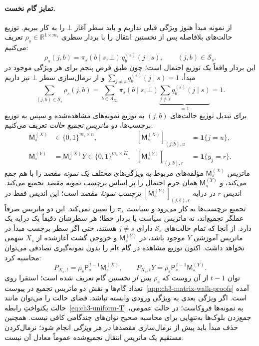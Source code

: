 \paragraph{تمایز گام نخست.}
از نمونه مبدأ هنوز ویژگی قبلی نداریم و باید سطر آغاز $\bot$ را به کار ببریم. توزیع حالت‌های بلافاصله پس از نخستین انتقال را با بردار سطری $\rho_s\in\mathbb R^{1\times m_s}$ تعریف می‌کنیم:
\begin{equation}\label{eq:ch3-block-first-step}
\rho_s(j,b)=\pi_s(b\mid s,\bot)\,q_b^{(s)}(j\mid s),
\qquad (j,b)\in\mathcal S_s.
\end{equation}
این بردار واقعاً یک توزیع احتمال است؛ چون طبق
فرض پنجم برای هر ویژگی موجود در مبدأ،
$\sum_{j\ne s}q_b^{(s)}(j\mid s)=1$ و از نرمال‌سازی
سطر $\bot$ نیز داریم
\[
\sum_{(j,b)\in\mathcal S_s}\rho_s(j,b)
=\sum_{b\in A_{X_s}}\pi_s(b\mid s,\bot)
\underbrace{\sum_{j\ne s}q_b^{(s)}(j\mid s)}_{=1}
=1.
\]
برای تبدیل توزیع حالت‌های $(j,b)$ به توزیع نمونه‌های
مشاهده‌شده و سپس به توزیع برچسب‌ها، دو
\emph{ماتریس تجمیع حالت} تعریف می‌کنیم:
\begin{equation}\label{eq:ch3-state-aggregation-matrices}
\boxed{
\begin{aligned}
\mathsf M_s^{(X)}
&\in\{0,1\}^{m_s\times n},
&
[\mathsf M_s^{(X)}]_{(j,b),u}
&=\mathbf1\{j=u\},\\
\mathsf M_s^{(Y)}
&=\mathsf M_s^{(X)}Y
\in\{0,1\}^{m_s\times K},
&
[\mathsf M_s^{(Y)}]_{(j,b),r}
&=\mathbf1\{y_j=r\}.
\end{aligned}}
\end{equation}
ماتریس $\mathsf M_s^{(X)}$ مؤلفه‌های مربوط به
ویژگی‌های مختلف \emph{یک نمونه مقصد} را با هم جمع می‌کند،
و $\mathsf M_s^{(Y)}$ همان جرم احتمال را بر اساس
\emph{برچسب نمونه مقصد} تجمیع می‌کند.
اندیس $r$ در درایه $[\mathsf M_s^{(Y)}]_{(j,b),r}$
\emph{برچسب نمونهٔ مقصد} است؛ این اندیس
فقط در تجمیع برچسب‌ها به کار می‌رود
و سیاست $\pi_s$ را تعیین نمی‌کند.
این دو ماتریس صرفاً عملگر تجمیع‌اند،
نه ماتریس سیاست یا بردار خطا؛
هر سطرشان دقیقاً یک درایه یک دارد.
از آنجا که تمام حالت‌های $\mathcal S_s$ دارای $j\ne s$
هستند، حتی اگر سطر برچسب مبدأ در ماتریس آموزشی $Y$
موجود باشد، در $\mathsf M_s^{(Y)}$ و خروجی
گشت آغازشده از $X_s$ سهمی نخواهد داشت.
اکنون توزیع مشاهده در گام $t$ام را بدون
نمونه‌گیری تصادفی می‌توان محاسبه کرد:
\begin{equation}\label{eq:ch3-block-t-step}
\boxed{P_{X_s,t}
=\rho_s\mathsf P_s^{\,t-1}\mathsf M_s^{(X)},\qquad
P_{X_s,t}Y
=\rho_s\mathsf P_s^{\,t-1}\mathsf M_s^{(Y)}.}
\end{equation}
توان $t-1$ از آن روست که $\rho_s$ \emph{پس از} نخستین گام تعریف شده است؛ استقرا روی تعداد گام‌ها و نقش دو ماتریس تجمیع در پیوست~\ref{app:ch3-matrix-walk-proofs} آمده است. اگر ویژگی بعدی به ویژگی ورودی وابسته نباشد، فضای حالت را می‌توان مانند حالت یکنواختِ رابطه~\eqref{eq:ch3-uniform-T} به نمونه‌ها فروکاست؛ در حالت عمومی، جمع‌زدن بلوک‌ها به‌تنهایی برای محاسبه صحیح توان‌های چندگامی کافی نیست. همچنین حذف مبدأ باید پیش از نرمال‌سازی مقصدها \emph{در هر ویژگی} انجام شود؛ نرمال‌کردن مستقیم یک ماتریس انتقال تجمیع‌شده عموماً معادل آن نیست.


